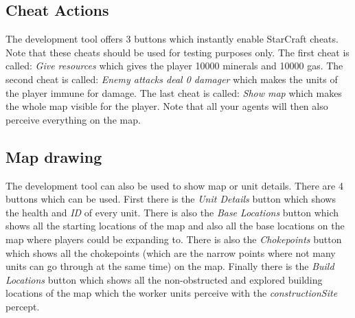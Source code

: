 \subsection{Cheat Actions}
The development tool offers 3 buttons which instantly enable StarCraft cheats. Note that these cheats should be used for testing purposes only. The first cheat is called: \textit{Give resources} which gives the player 10000 minerals and 10000 gas. The second cheat is called: \textit{Enemy attacks deal 0 damager} which makes the units of the player immune for damage. The last cheat is called: \textit{Show map} which makes the whole map visible for the player. Note that  all your agents will then also perceive everything on the map.

\subsection{Map drawing}
The development tool can also be used to show map or unit details. There are 4 buttons which can be used. First there is the \textit{Unit Details} button which shows the health and \textit{ID} of every unit. There is also the \textit{Base Locations} button which shows all the starting locations of the map and also all the base locations on the map where players could be expanding to. There is also the \textit{Chokepoints} button which shows all the chokepoints (which are the narrow points where not many units can go through at the same time) on the map. Finally there is the \textit{Build Locations} button which shows all the non-obstructed and explored building locations of the map which the worker units perceive with the \textit{constructionSite} percept.